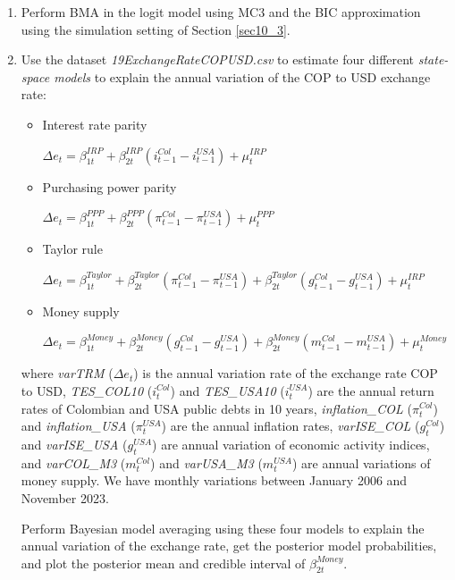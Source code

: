 \begin{enumerate}
\item Perform BMA in the logit model using MC3 and the BIC approximation using the simulation setting of Section \ref{sec10_3}.

\item Use the dataset \textit{19ExchangeRateCOPUSD.csv} to estimate four different \textit{state-space models} to explain the annual variation of the COP to USD exchange rate: 
\begin{itemize}
	\item Interest rate parity
	
	$\Delta e_t = \beta_{1t}^{IRP} + \beta_{2t}^{IRP} (i_{t-1}^{Col}-i_{t-1}^{USA})+\mu_{t}^{IRP}$ 
	\item Purchasing power parity
	
	$\Delta e_t = \beta_{1t}^{PPP} + \beta_{2t}^{PPP} (\pi_{t-1}^{Col}-\pi_{t-1}^{USA})+\mu_{t}^{PPP}$
	\item Taylor rule
	
	$\Delta e_t = \beta_{1t}^{Taylor} + \beta_{2t}^{Taylor} (\pi_{t-1}^{Col}-\pi_{t-1}^{USA})+\beta_{2t}^{Taylor} (g_{t-1}^{Col}-g_{t-1}^{USA})+\mu_{t}^{IRP}$
	\item Money supply
	
	$\Delta e_t = \beta_{1t}^{Money} + \beta_{2t}^{Money} (g_{t-1}^{Col}-g_{t-1}^{USA})+\beta_{2t}^{Money} (m_{t-1}^{Col}-m_{t-1}^{USA})+\mu_{t}^{Money}$   
\end{itemize}
where \textit{varTRM} ($\Delta e_t$) is the annual variation rate of the exchange rate COP to USD, \textit{TES\_COL10} ($i_{t}^{Col}$) and \textit{TES\_USA10} ($i_{t}^{USA}$) are the annual return rates of Colombian and USA public debts in 10 years, \textit{inflation\_COL} ($\pi_{t}^{Col}$) and \textit{inflation\_USA} ($\pi_{t}^{USA}$) are the annual inflation rates, \textit{varISE\_COL} ($g_{t}^{Col}$) and \textit{varISE\_USA} ($g_{t}^{USA}$) are annual variation of economic activity indices, and \textit{varCOL\_M3} ($m_{t}^{Col}$) and \textit{varUSA\_M3} ($m_{t}^{USA}$) are annual variations of money supply. We have monthly variations between January 2006 and November 2023.

Perform Bayesian model averaging using these four models to explain the annual variation of the exchange rate, get the posterior model probabilities, and plot the posterior mean and credible interval of $\beta_{2t}^{Money}$.     


\end{enumerate}
